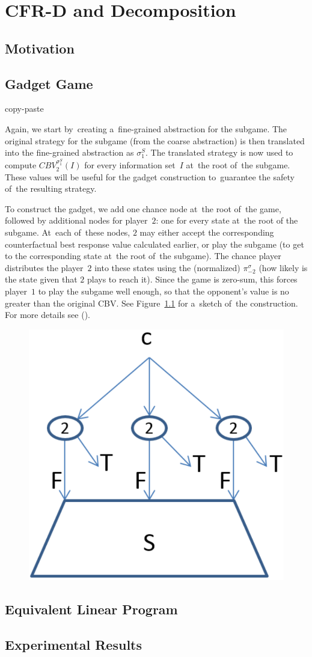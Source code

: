 \chapter{CFR-D and Decomposition}
\label{ch:cfr-d}

\section{Motivation}

\section{Gadget Game}
\todo copy-paste

Again, we start by~creating a~fine-grained abstraction for the subgame.
The original strategy for the subgame (from the coarse abstraction) is then translated into the fine-grained abstraction as $\sigma_1^S$.
The translated strategy is now used to compute $CBV_2 ^{\sigma_1^S} (I)$ for every information set~$I$ at~the root of~the subgame.
These values will be useful for the gadget construction to~guarantee the safety of~the resulting strategy.

To construct the gadget, we add one chance node at~the root of~the game, followed by additional nodes for player~$2$:
one for every state at~the root of the subgame.
At~each of~these nodes, $2$ may either accept the corresponding counterfactual best response value calculated earlier, or play the subgame (to get to the corresponding state at~the root of~the subgame).
The chance player distributes the player~$2$ into these states using the (normalized) $\pi^\sigma_{-2}$ (how likely is the state given that $2$ plays to reach it).
Since the game is zero-sum, this forces player~$1$ to play the subgame well enough, so that the opponent's value is no greater than the original CBV.
See Figure~\ref{fig:re-solving-gadget} for a~sketch of~the construction.
For more details see (\cite{BurchJohansonBowling13}).

\begin{figure}[H]
  \centering
  \includegraphics[width=.3\textwidth]{../img/re-solving-game-gadget.png}
  \label{fig:re-solving-gadget}
\end{figure}

\section{Equivalent Linear Program}

\section{Experimental Results}

